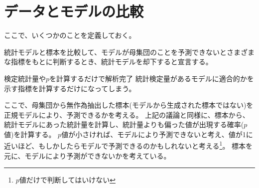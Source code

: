 \section{データとモデルの比較}
ここで、いくつかのことを定義しておく。
\begin{defi}
    統計モデルと標本を比較して、モデルが母集団のことを予測できないとさまざまな指標をもとに判断するとき、統計モデルを却下すると宣言する。
\end{defi}

\begin{SMbox}{検定統計量や$p$を計算するだけで解析完了}
    統計検定量があるモデルに適合的かを示す指標を計算するだけになってしまう。
\end{SMbox}


ここで、母集団から無作為抽出した標本(モデルから生成された標本ではない)を正規モデルにより、予測できるかを考える。
上記の議論と同様に、標本から、統計モデルにあった統計量を計算し、統計量よりも偏った値が出現する確率($p$値)を計算する。
$p$値が小さければ、モデルにより予測できないと考え、値が1に近いほど、もしかしたらモデルで予測できるのかもしれないと考える\footnote{$p$値だけで判断してはいけない}。
標本を元に、モデルにより予測ができないかを考えている。


